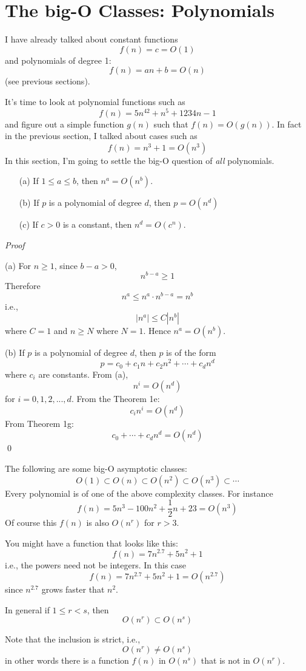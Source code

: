 \section{The big-O Classes: Polynomials}

I have already talked about constant functions
\[
f(n) = c = O(1)
\]
and polynomials of degree 1:
\[
f(n) = an + b = O(n)
\]
(see previous sections).

It's time to look at polynomial functions such as
\[
f(n) = 5n^{42} + n^5 + 1234n - 1
\]
and figure out a simple function $g(n)$ such that $f(n) = O(g(n))$.
In fact in the previous section, I talked about cases such as
\[
f(n) = n^3 + 1 = O(n^3)
\]
In this section, I'm going to settle the big-O question of
\textit{all} polynomials.


\begin{thm} \mbox{}
 \begin{enumerate}
  \item[(a)] If $1 \leq a \leq b$, then $n^a = O(n^b)$.
  \item[(b)] If $p$ is a polynomial of degree $d$, then $p = O(n^d)$
  \item[(c)] If $c > 0$ is a constant, then $n^d = O(c^n)$.
 \end{enumerate}
\end{thm}

\textit{Proof}

(a) For $n \geq 1$, since $b - a > 0$,
\[
n^{b - a} \geq 1
\]
Therefore
\[
n^a \leq n^a \cdot n^{b-a} = n^b 
\]
i.e.,
\[
|n^a| \leq C|n^{b}|
\]
where $C = 1$ and $n \geq N$ where $N = 1$.
Hence $n^a = O(n^b)$.

(b) If $p$ is a polynomial of degree $d$, then 
$p$ is of the form
\[
p = c_0 + c_1n + c_2n^2 + \cdots + c_d n^d
\]
where $c_i$ are constants.
From (a),
\[
n^i = O(n^d)
\]
for $i = 0, 1, 2, ..., d$.
From the Theorem 1e:
\[
c_i n^i = O(n^d)
\]
From Theorem 1g:
\[
c_0 + \cdots + c_dn^d = O(n^d)
\]
\qed



The following are some big-O asymptotic classes:
\[
O(1) \subset
O(n) \subset
O(n^2) \subset
O(n^3) \subset \cdots
\]
Every polynomial is of one of the above complexity classes.
For instance 
\[
f(n) = 5n^3 - 100n^2 + \frac{1}{2}n + 23 = O(n^3)
\]
Of course this $f(n)$ is also $O(n^r)$ for $r > 3$.

You might have a function that looks like this:
\[
f(n) = 7n^{2.7} + 5n^2 + 1
\]
i.e., the powers need not be integers.
In this case
\[
f(n) = 7n^{2.7} + 5n^2 + 1 = O(n^{2.7})
\]
since $n^{2.7}$ grows faster that $n^2$.

In general if $1 \leq r < s$, then
\[
O(n^r) \subset O(n^s)
\]

Note that the inclusion is strict, i.e., 
\[
O(n^r) \neq O(n^s)
\]
in other words there is a function $f(n)$ in $O(n^s)$ that is not in 
$O(n^r)$.


